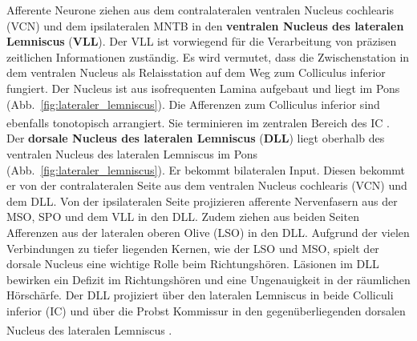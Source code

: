 \documentclass[12pt,a4paper,pdftex]{article}
\begin{document}
Afferente Neurone ziehen aus dem contralateralen ventralen Nucleus cochlearis (VCN) und dem ipsilateralen MNTB in den \textbf{ventralen Nucleus des lateralen Lemniscus} (\textbf{VLL}). Der VLL ist vorwiegend für die Verarbeitung von präzisen zeitlichen Informationen zuständig.
Es wird vermutet, dass die Zwischenstation in dem ventralen Nucleus als Relaisstation auf dem Weg zum Colliculus inferior fungiert.
Der Nucleus ist aus isofrequenten Lamina aufgebaut und liegt im Pons (Abb.~\ref{fig:lateraler_lemniscus}). Die Afferenzen zum Colliculus inferior sind ebenfalls tonotopisch arrangiert. Sie terminieren im zentralen Bereich des IC \textsuperscript{\cite[29]{paxinos2014rat}}.
\\

Der \textbf{dorsale Nucleus des lateralen Lemniscus} (\textbf{DLL}) liegt oberhalb des ventralen Nucleus des lateralen Lemniscus im Pons (Abb.~\ref{fig:lateraler_lemniscus}). Er bekommt bilateralen Input. Diesen bekommt er von der contralateralen Seite aus dem ventralen Nucleus cochlearis (VCN) und dem DLL. Von der ipsilateralen Seite projizieren afferente Nervenfasern aus der MSO, SPO und dem VLL in den DLL. Zudem ziehen aus beiden Seiten Afferenzen aus der lateralen oberen Olive (LSO) in den DLL.
Aufgrund der vielen Verbindungen zu tiefer liegenden Kernen, wie der LSO und MSO, spielt der dorsale Nucleus eine wichtige Rolle beim Richtungshören. Läsionen im DLL bewirken ein Defizit im Richtungshören und eine Ungenauigkeit in der räumlichen Hörschärfe. 
Der DLL projiziert über den lateralen Lemniscus in beide Colliculi inferior (IC) und über die Probst Kommissur in den gegenüberliegenden dorsalen Nucleus des lateralen Lemniscus
\textsuperscript{\cite[29]{paxinos2014rat}}.
\end{document}
